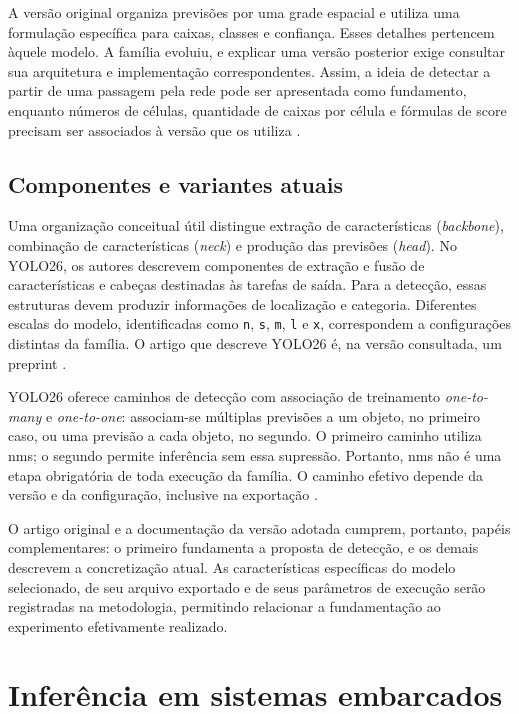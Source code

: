 A versão original organiza previsões por uma grade espacial e utiliza uma formulação específica para caixas, classes e confiança. Esses detalhes pertencem àquele modelo. A família evoluiu, e explicar uma versão posterior exige consultar sua arquitetura e implementação correspondentes. Assim, a ideia de detectar a partir de uma passagem pela rede pode ser apresentada como fundamento, enquanto números de células, quantidade de caixas por célula e fórmulas de score precisam ser associados à versão que os utiliza \cite{yolo-original}.

\subsection{Componentes e variantes atuais}
\label{subsec:variantes-yolo}

Uma organização conceitual útil distingue extração de características (\textit{backbone}), combinação de características (\textit{neck}) e produção das previsões (\textit{head}). No YOLO26, os autores descrevem componentes de extração e fusão de características e cabeças destinadas às tarefas de saída. Para a detecção, essas estruturas devem produzir informações de localização e categoria. Diferentes escalas do modelo, identificadas como \texttt{n}, \texttt{s}, \texttt{m}, \texttt{l} e \texttt{x}, correspondem a configurações distintas da família. O artigo que descreve YOLO26 é, na versão consultada, um preprint \cite{yolo26-paper}.

YOLO26 oferece caminhos de detecção com associação de treinamento \textit{one-to-many} e \textit{one-to-one}: associam-se múltiplas previsões a um objeto, no primeiro caso, ou uma previsão a cada objeto, no segundo. O primeiro caminho utiliza \gls{nms}; o segundo permite inferência sem essa supressão. Portanto, \gls{nms} não é uma etapa obrigatória de toda execução da família. O caminho efetivo depende da versão e da configuração, inclusive na exportação \cite{yolo26-paper,ultralytics-yolo26}.

O artigo original e a documentação da versão adotada cumprem, portanto, papéis complementares: o primeiro fundamenta a proposta de detecção, e os demais descrevem a concretização atual. As características específicas do modelo selecionado, de seu arquivo exportado e de seus parâmetros de execução serão registradas na metodologia, permitindo relacionar a fundamentação ao experimento efetivamente realizado.

\section{Inferência em sistemas embarcados}
\label{sec:inferencia-embarcada}

